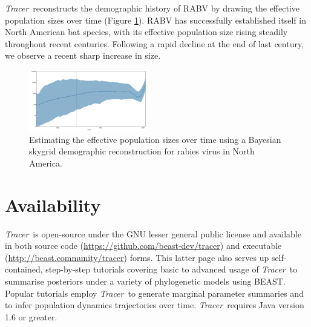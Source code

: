 \documentclass{bioinfo_tracer}
\newcommand{\tracer}{\emph{Tracer}}
\begin{document}
\tracer\ reconstructs the demographic history of RABV by drawing the effective population sizes over time (Figure \ref{fig:rabv}).
RABV has successfully established itself in North American bat species, with its effective population size rising steadily throughout recent centuries.
Following a rapid decline at the end of last century, we observe a recent sharp increase in size.

\begin{figure}[t]
\centerline{
\includegraphics[width=0.46\textwidth]{./figures/rabv-skygrid.pdf}
}
\caption{Estimating the effective population sizes over time using a Bayesian skygrid demographic reconstruction for rabies virus in North America.}
\label{fig:rabv}
\end{figure}

\section*{Availability}

\tracer\ is open-source under the GNU lesser general public license and available in both source code (\url{https://github.com/beast-dev/tracer}) and executable (\url{http://beast.community/tracer}) forms.
This latter page also serves up self-contained, step-by-step tutorials covering basic to advanced usage of \tracer\ to summarise posteriors under a variety of phylogenetic models using BEAST.
Popular tutorials employ \tracer\ to generate marginal parameter summaries and to infer population dynamics trajectories over time.
\tracer\ requires Java version 1.6 or greater.
\end{document}
